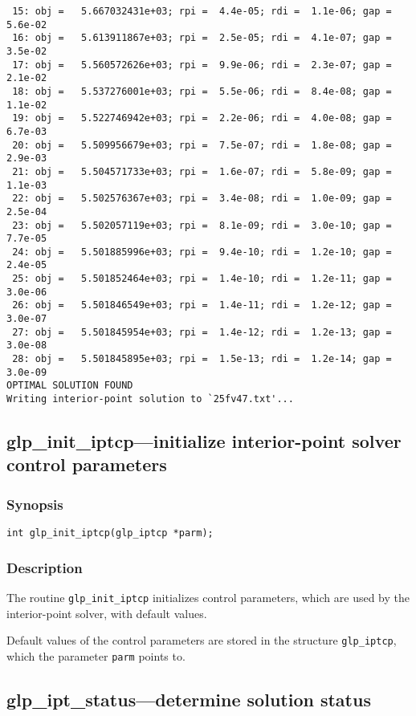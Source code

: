 \begin{footnotesize}
\begin{verbatim}
 15: obj =   5.667032431e+03; rpi =  4.4e-05; rdi =  1.1e-06; gap =  5.6e-02
 16: obj =   5.613911867e+03; rpi =  2.5e-05; rdi =  4.1e-07; gap =  3.5e-02
 17: obj =   5.560572626e+03; rpi =  9.9e-06; rdi =  2.3e-07; gap =  2.1e-02
 18: obj =   5.537276001e+03; rpi =  5.5e-06; rdi =  8.4e-08; gap =  1.1e-02
 19: obj =   5.522746942e+03; rpi =  2.2e-06; rdi =  4.0e-08; gap =  6.7e-03
 20: obj =   5.509956679e+03; rpi =  7.5e-07; rdi =  1.8e-08; gap =  2.9e-03
 21: obj =   5.504571733e+03; rpi =  1.6e-07; rdi =  5.8e-09; gap =  1.1e-03
 22: obj =   5.502576367e+03; rpi =  3.4e-08; rdi =  1.0e-09; gap =  2.5e-04
 23: obj =   5.502057119e+03; rpi =  8.1e-09; rdi =  3.0e-10; gap =  7.7e-05
 24: obj =   5.501885996e+03; rpi =  9.4e-10; rdi =  1.2e-10; gap =  2.4e-05
 25: obj =   5.501852464e+03; rpi =  1.4e-10; rdi =  1.2e-11; gap =  3.0e-06
 26: obj =   5.501846549e+03; rpi =  1.4e-11; rdi =  1.2e-12; gap =  3.0e-07
 27: obj =   5.501845954e+03; rpi =  1.4e-12; rdi =  1.2e-13; gap =  3.0e-08
 28: obj =   5.501845895e+03; rpi =  1.5e-13; rdi =  1.2e-14; gap =  3.0e-09
OPTIMAL SOLUTION FOUND
Writing interior-point solution to `25fv47.txt'...
\end{verbatim}
\end{footnotesize}

\subsection{glp\_init\_iptcp---initialize interior-point solver control
parameters}

\subsubsection*{Synopsis}

\begin{verbatim}
int glp_init_iptcp(glp_iptcp *parm);
\end{verbatim}

\subsubsection*{Description}

The routine \verb|glp_init_iptcp| initializes control parameters, which
are used by the interior-point solver, with default values.

Default values of the control parameters are stored in the structure
\verb|glp_iptcp|, which the parameter \verb|parm| points to.

\subsection{glp\_ipt\_status---determine solution status}

